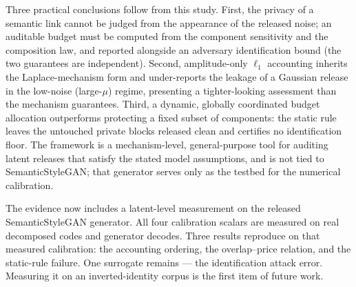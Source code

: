 \documentclass[10pt,twocolumn,letterpaper]{article}
\theoremstyle{plain}
\theoremstyle{definition}
\begin{document}
Three practical conclusions follow from this study. First, the privacy of a
semantic link cannot be judged from the appearance of the released noise; an
auditable budget must be computed from the component sensitivity and the
composition law, and reported alongside an adversary identification bound
(the two guarantees are independent). Second, amplitude-only $\ell_1$
accounting inherits the Laplace-mechanism form and under-reports the leakage of
a Gaussian release in the low-noise (large-$\mu$) regime, presenting a
tighter-looking assessment than the mechanism guarantees. Third, a dynamic,
globally coordinated budget allocation outperforms protecting a fixed subset of
components: the static rule leaves the untouched private blocks released clean
and certifies no identification floor. The framework is a mechanism-level,
general-purpose tool for auditing latent releases that satisfy the stated
model assumptions, and is not tied to SemanticStyleGAN; that generator serves
only as the testbed for the numerical calibration.

The evidence now includes a latent-level measurement on the released SemanticStyleGAN
generator. All four calibration scalars are measured on real decomposed codes and
generator decodes. Three results reproduce on that measured calibration: the accounting
ordering, the overlap--price relation, and the static-rule failure. One surrogate
remains --- the identification attack error. Measuring it on an inverted-identity corpus
is the first item of future work.
\end{document}

